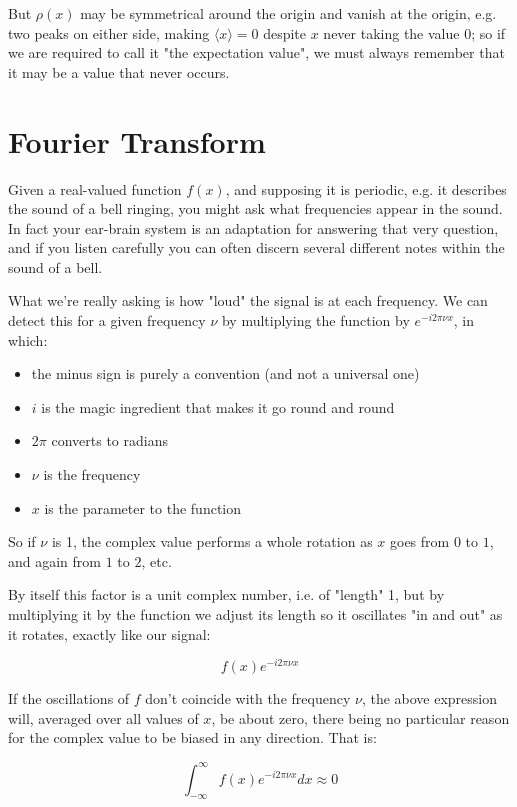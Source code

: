 But $\rho(x)$ may be symmetrical around the origin and vanish at the origin, e.g. two peaks on either side, making $\langle x \rangle = 0$ despite $x$ never taking the value $0$; so if we are required to call it "the expectation value", we must always remember that it may be a value that never occurs.

\section{Fourier Transform} \label{sec:fourier}

Given a real-valued function $f(x)$, and supposing it is periodic, e.g. it describes the sound of a bell ringing, you might ask what frequencies appear in the sound. In fact your ear-brain system is an adaptation for answering that very question, and if you listen carefully you can often discern several different notes within the sound of a bell.

What we're really asking is how "loud" the signal is at each frequency. We can detect this for a given frequency $\nu$ by multiplying the function by $e^{-i2\pi\nu x}$, in which:

\begin{itemize} 
    \item the minus sign is purely a convention (and not a universal one)
    \item $i$ is the magic ingredient that makes it go round and round
    \item $2\pi$ converts to radians
    \item $\nu$ is the frequency
    \item $x$ is the parameter to the function
\end{itemize}

So if $\nu$ is 1, the complex value performs a whole rotation as $x$ goes from $0$ to $1$, and again from $1$ to $2$, etc.

By itself this factor is a unit complex number, i.e. of "length" 1, but by multiplying it by the function we adjust its length so it oscillates "in and out" as it rotates, exactly like our signal:

$$f(x)e^{-i2\pi\nu x}$$

If the oscillations of $f$ don't coincide with the frequency $\nu$, the above expression will, averaged over all values of $x$, be about zero, there being no particular reason for the complex value to be biased in any direction. That is:

$$\int_{-\infty}^{\infty} f(x)e^{-i2\pi\nu x} dx \approx 0 $$

